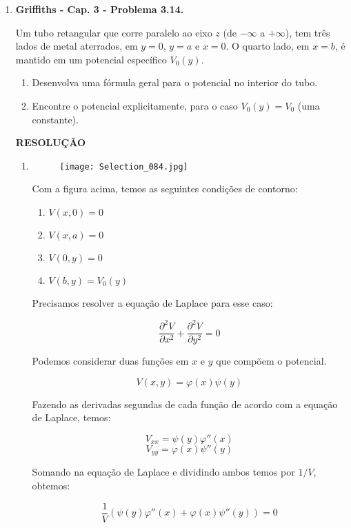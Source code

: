 \documentclass[11pt,a4paper]{article}
\begin{document}
\begin{enumerate}
\item \textbf{Griffiths - Cap. 3 - Problema 3.14.}

Um tubo retangular que corre paralelo ao eixo $z$ (de $-\infty$ a $+\infty$), tem três lados de metal aterrados, em $y = 0$, $y = a$ e $x = 0$. O quarto lado, em $x = b$, é mantido em um potencial específico $V_0(y)$.

\begin{enumerate}
\item Desenvolva uma fórmula geral para o potencial no interior do tubo.
\item Encontre o potencial explicitamente, para o caso $V_0(y) = V_0$ (uma constante).
\end{enumerate}


\textbf{RESOLUÇÃO}

\begin{enumerate}

\item 

\begin{figure}[h]	
\centering %
\texttt{[image: Selection\_084.jpg]} 
\end{figure}

Com a figura acima, temos as seguintes condições de contorno:

\begin{enumerate}
\item $V(x,0) = 0$
\item $V(x,a) = 0$
\item $V(0,y) = 0$
\item $V(b,y) = V_0(y)$
\end{enumerate}

Precisamos resolver a equação de Laplace para esse caso:

$$\displaystyle\dfrac{\partial ^2 V}{\partial x^2} + \displaystyle\dfrac{\partial ^2 V}{\partial y^2} = 0$$

Podemos considerar duas funções em $x$ e $y$ que compõem o potencial. 

$$V(x,y) = \varphi (x) \psi (y)$$

Fazendo as derivadas segundas de cada função de acordo com a equação de Laplace, temos:

$$V_{xx} = \psi (y) \varphi '' (x) $$
$$V_{yy} = \varphi (x) \psi '' (y) $$ 

Somando na equação de Laplace e dividindo ambos temos por $1/V$, obtemos:

$$\displaystyle\dfrac{1}{V}(\psi (y) \varphi '' (x) + \varphi (x) \psi '' (y)) = 0$$


\end{enumerate}
\end{enumerate}
\end{document}
